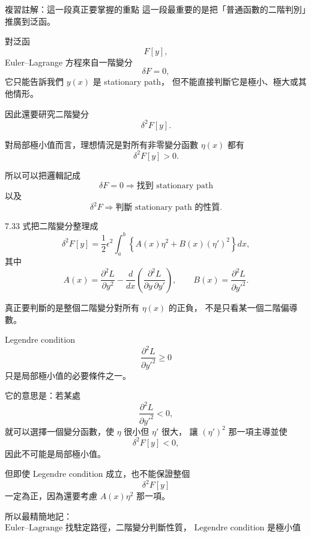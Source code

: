 \documentclass[11pt,a4paper,twoside]{article}
\newcommand{\StudyNote}[2]{\begin{studyNote}{#1}#2\end{studyNote}}
\begin{document}
\StudyNote{複習註解：這一段真正要掌握的重點}{
這一段最重要的是把「普通函數的二階判別」推廣到泛函。

對泛函
\[
    F[y],
\]
Euler--Lagrange 方程來自一階變分
\[
    \delta F=0,
\]
它只能告訴我們 $y(x)$ 是 stationary path，
但不能直接判斷它是極小、極大或其他情形。

因此還要研究二階變分
\[
    \delta^2F[y].
\]

對局部極小值而言，理想情況是對所有非零變分函數 $\eta(x)$ 都有
\[
    \delta^2F[y]>0.
\]

所以可以把邏輯記成
\[
    \boxed{
        \delta F=0
        \Longrightarrow
        \text{找到 stationary path}
    }
\]
以及
\[
    \boxed{
        \delta^2F
        \Longrightarrow
        \text{判斷 stationary path 的性質}
    }.
\]

7.33 式把二階變分整理成
\[
    \delta^2F[y]
    =
    \frac12\epsilon^2
    \int_a^b
    \left\{
    A(x)\eta^2
    +
    B(x)(\eta')^2
    \right\}dx,
\]
其中
\[
    A(x)
    =
    \frac{\partial^2L}{\partial y^2}
    -
    \frac{d}{dx}
    \left(
    \frac{\partial^2L}{\partial y\,\partial y'}
    \right),
    \qquad
    B(x)
    =
    \frac{\partial^2L}{\partial y'^2}.
\]

真正要判斷的是整個二階變分對所有 $\eta(x)$ 的正負，
不是只看某一個二階偏導數。

Legendre condition
\[
    \boxed{
        \frac{\partial^2L}{\partial y'^2}\ge0
    }
\]
只是局部極小值的必要條件之一。

它的意思是：若某處
\[
    \frac{\partial^2L}{\partial y'^2}<0,
\]
就可以選擇一個變分函數，使 $\eta$ 很小但 $\eta'$ 很大，
讓 $(\eta')^2$ 那一項主導並使
\[
    \delta^2F[y]<0,
\]
因此不可能是局部極小值。

但即使 Legendre condition 成立，也不能保證整個
\[
    \delta^2F[y]
\]
一定為正，因為還要考慮 $A(x)\eta^2$ 那一項。

所以最精簡地記：
\[
    \boxed{
        \text{Euler--Lagrange 找駐定路徑，二階變分判斷性質，
            Legendre condition 是極小值的必要條件。}
    }
\]
}
\end{document}
